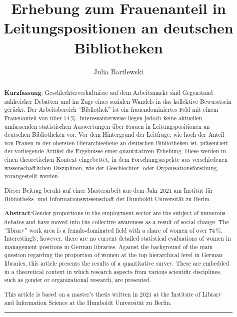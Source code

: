 \documentclass[a4paper,
fontsize=11pt,
oneside,
numbers=noperiodatend,
parskip=half-,
bibliography=totoc,
final
]{scrartcl}
\title{\LARGE{Erhebung zum Frauenanteil in Leitungspositionen an deutschen Bibliotheken}}%
\author{Julia Bartlewski} %
\date{}
\begin{document}
\maketitle
\thispagestyle{fancyplain} 

\begin{abstract}
\noindent
\textbf{Kurzfassung}: Geschlechterverhältnisse auf dem Arbeitsmarkt sind Gegenstand zahlreicher Debatten und im Zuge eines sozialen Wandels in das kollektive Bewusstsein gerückt. Der Arbeitsbereich \enquote{Bibliothek} ist ein frauendominiertes Feld mit einem Frauenanteil von über 74\,\%. Interessanterweise liegen jedoch keine aktuellen umfassenden statistischen Auswertungen über Frauen in Leitungspositionen an deutschen Bibliotheken vor. Vor dem Hintergrund der Leitfrage, wie hoch der Anteil von Frauen in der obersten Hierarchieebene an deutschen Bibliotheken ist, präsentiert der vorliegende Artikel die Ergebnisse einer quantitativen Erhebung. Diese werden in einen theoretischen Kontext eingebettet, in dem Forschungsaspekte aus verschiedenen wissenschaftlichen Disziplinen, wie der Geschlechter- oder Organisationsforschung, vorangestellt werden.

Dieser Beitrag beruht auf einer Masterarbeit aus dem Jahr 2021 am Institut für Bibliotheks- und Informationswissenschaft der Humboldt Universität zu Berlin.

\vspace*{1em}
\noindent
\textbf{Abstract}:Gender proportions in the employment sector are the subject of numerous debates and have moved into the collective awareness as a result of social change. The \enquote{library} work area is a female-dominated field with a share of women of over 74\,\%. Interestingly, however, there are no current detailed statistical evaluations of women in management positions in German libraries. Against the background of the main question regarding the proportion of women at the top hierarchical level in German libraries, this article presents the results of a quantitative survey. These are embedded in a theoretical context in which research aspects from various scientific disciplines, such as gender or organizational research, are presented.

This article is based on a master's thesis written in 2021 at the Institute of Library and Information Science at the Humboldt Universität zu Berlin.

\begin{center}\rule{0.5\linewidth}{0.5pt}\end{center}
\end{abstract}
\end{document}
